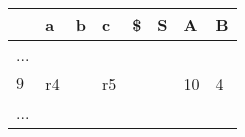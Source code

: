 \documentclass{standalone}
\providecommand\lightrule{%
	\arrayrulecolor{black!30}%
	\midrule[\lightrulewidth]%
	\arrayrulecolor{black}}
\begin{document}
\begin{tabularx}{\textwidth}{XXXXXXXX}
         & a & b & c & \$ & S & A & B \\
        \midrule
            ...
            \\ \lightrule
            \(9\) & r4 & & r5 & & & 10 & 4
            \\ \lightrule
            ...
    \end{tabularx}
\end{document}
